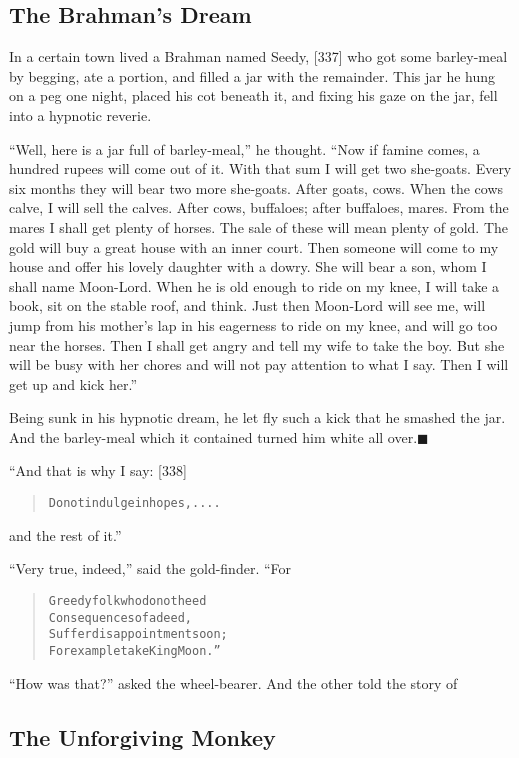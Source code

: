 \documentclass[article, twoside, 14pt]{memoir}
\newcommand{\qed}{\hfill \ensuremath{\blacksquare}}
\renewenvironment{verbatim}{%
\begin{quote}%
\vskip -10pt%
\begin{alltt}\normalfont\large}{\end{alltt}%
\end{quote}%
\vskip -10pt
} %
\begin{document}
\subsection{The Brahman's Dream}

\label{s86}

In a certain town lived a Brahman named Seedy, [337] who got some
barley-meal by begging, ate a portion, and filled a jar with the
remainder. This jar he hung on a peg one night, placed his cot
beneath it, and fixing his gaze on the jar, fell into a hypnotic
reverie.

``Well, here is a jar full of barley-meal,'' he thought.
``Now if famine comes, a hundred rupees will come out of it. With that sum I will get two she-goats. Every six months they will bear two more she-goats. After goats, cows. When the cows calve, I will sell the calves. After cows, buffaloes; after buffaloes, mares. From the mares I shall get plenty of horses. The sale of these will mean plenty of gold. The gold will buy a great house with an inner court. Then someone will come to my house and offer his lovely daughter with a dowry. She will bear a son, whom I shall name Moon-Lord. When he is old enough to ride on my knee, I will take a book, sit on the stable roof, and think. Just then Moon-Lord will see me, will jump from his mother's lap in his eagerness to ride on my knee, and will go too near the horses. Then I shall get angry and tell my wife to take the boy. But she will be busy with her chores and will not pay attention to what I say. Then I will get up and kick her.''

Being sunk in his hypnotic dream, he let fly such a kick that he
smashed the jar. And the barley-meal which it contained turned him
white all over.\hyperref[s86]{\qed}

“And that is why I say: [338]

\begin{verbatim}
Do not indulge in hopes, ....
\end{verbatim}
and the rest of it.”

``Very true, indeed,'' said the gold-finder. “For

\begin{verbatim}
Greedy folk who do not heed
Consequences of a deed,
Suffer disappointment soon;
For example take King Moon.”
\end{verbatim}
``How was that?'' asked the wheel-bearer. And the other told the
story of

\subsection{The Unforgiving Monkey}
\end{document}
